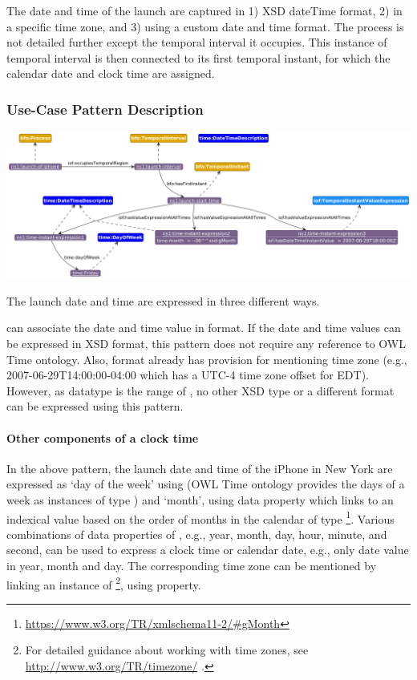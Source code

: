 The date and time of the launch are captured in 1) XSD dateTime format, 2) in a specific time zone, and 3) using a custom date and time format. The process  is not detailed further except the temporal interval it occupies. This instance of temporal interval is then connected to its first temporal instant, for which the calendar date and clock time are assigned.   

\subsubsection*{Use-Case Pattern Description}

\includegraphics[scale=0.35]{scenarios/clock-time-calendar-date/images/uc1-dow-mn.png}

The launch date and time are expressed in three different ways.  

 can associate the date and time value in  format. If the date and time values can be expressed in XSD format, this pattern does not require any reference to OWL Time ontology. Also,  format already has provision for mentioning time zone (e.g., 2007-06-29T14:00:00-04:00 which has a UTC-4 time zone offset for EDT). However, as  datatype is the range of , no other XSD type or a different format can be expressed using this pattern. 

\paragraph{Other components of a clock time \\}

In the above pattern, the launch date and time of the iPhone in New York are expressed as `day of the week' using  (OWL Time ontology provides the days of a week as instances of type )  and `month', using  data property  which links to an indexical value based on the order of months in the calendar of type  \footnote{\url{https://www.w3.org/TR/xmlschema11-2/\#gMonth}}.
Various combinations of data properties of , e.g.,  year, month, day, hour, minute, and second, can be used to express a clock time or calendar date, e.g., only date value in year, month and day. The corresponding time zone can be mentioned by linking an instance of  \footnote{For detailed guidance about working with time zones, see \url{http://www.w3.org/TR/timezone/} .}, using  property.       

